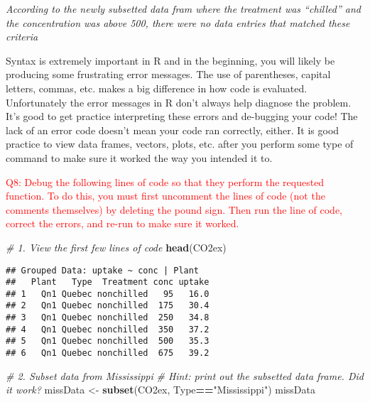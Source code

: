\documentclass[]{article}
\newenvironment{Shaded}{\begin{snugshade}}{\end{snugshade}}
\newcommand{\CommentTok}[1]{\textcolor[rgb]{0.56,0.35,0.01}{\textit{#1}}}
\newcommand{\DecValTok}[1]{\textcolor[rgb]{0.00,0.00,0.81}{#1}}
\newcommand{\KeywordTok}[1]{\textcolor[rgb]{0.13,0.29,0.53}{\textbf{#1}}}
\newcommand{\NormalTok}[1]{#1}
\newcommand{\OperatorTok}[1]{\textcolor[rgb]{0.81,0.36,0.00}{\textbf{#1}}}
\newcommand{\StringTok}[1]{\textcolor[rgb]{0.31,0.60,0.02}{#1}}
\begin{document}
\begin{Shaded}
\end{Shaded}

\emph{According to the newly subsetted data fram where the treatment was
``chilled'' and the concentration was above 500, there were no data
entries that matched these criteria}

Syntax is extremely important in R and in the beginning, you will likely
be producing some frustrating error messages. The use of parentheses,
capital letters, commas, etc. makes a big difference in how code is
evaluated. Unfortunately the error messages in R don't always help
diagnose the problem. It's good to get practice interpreting these
errors and de-bugging your code! The lack of an error code doesn't mean
your code ran correctly, either. It is good practice to view data
frames, vectors, plots, etc. after you perform some type of command to
make sure it worked the way you intended it to.

\textcolor{red}{Q8: Debug the following lines of code so that they perform the requested function. To do this, you must first uncomment the lines of code (not the comments themselves) by deleting the pound sign. Then run the line of code, correct the errors, and re-run to make sure it worked.}

\begin{Shaded}
\begin{Highlighting}[]
\CommentTok{# 1. View the first few lines of code}
\KeywordTok{head}\NormalTok{(CO2ex)}
\end{Highlighting}
\end{Shaded}

\begin{verbatim}
## Grouped Data: uptake ~ conc | Plant
##   Plant   Type  Treatment conc uptake
## 1   Qn1 Quebec nonchilled   95   16.0
## 2   Qn1 Quebec nonchilled  175   30.4
## 3   Qn1 Quebec nonchilled  250   34.8
## 4   Qn1 Quebec nonchilled  350   37.2
## 5   Qn1 Quebec nonchilled  500   35.3
## 6   Qn1 Quebec nonchilled  675   39.2
\end{verbatim}

\begin{Shaded}
\begin{Highlighting}[]
\CommentTok{# 2. Subset data from Mississippi}
\CommentTok{# Hint: print out the subsetted data frame. Did it work?}
\NormalTok{missData <-}\StringTok{ }\KeywordTok{subset}\NormalTok{(CO2ex, Type}\OperatorTok{==}\StringTok{"Mississippi"}\NormalTok{)}
\NormalTok{missData}
\end{Highlighting}
\end{Shaded}
\end{document}
